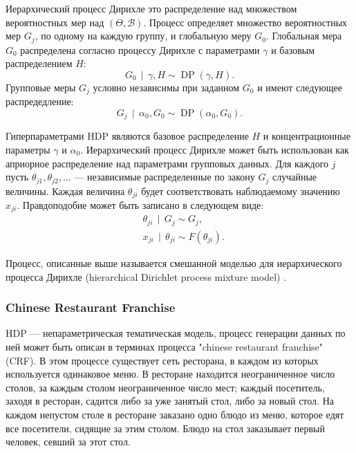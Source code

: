 \documentclass[14pt,a4paper,oneside]{extarticle}
\newcommand\todo[1]{\marginpar{\textcolor{red}{#1}}}
\DeclareMathOperator{\DP}{DP}
\DeclareMathOperator{\svert}{\,\vert\,}
\begin{document}
  Иерархический процесс Дирихле это распределение над множеством вероятностных мер над $(\Theta, \mathcal{B})$. Процесс определяет множество вероятностных мер $G_j$, по одному на каждую группу, и глобальную меру $G_0$. Глобальная мера $G_0$ распределена согласно процессу Дирихле с параметрами $\gamma$ и базовым распределением $H$:
  \begin{equation}
  G_0 \svert \gamma, H \sim \DP(\gamma, H).
  \end{equation}
  Групповые меры $G_j$ условно независимы при заданном $G_0$ и имеют следующее распредедление:
  \begin{equation}
  G_j \svert \alpha_0, G_0 \sim \DP(\alpha_0, G_0).
  \end{equation}
  
  Гиперпараметрами HDP являются базовое распределение $H$ и концентрационные параметры $\gamma$ и $\alpha_0$.
  Иерархический процесс Дирихле может быть использован как априорное распределение над параметрами групповых данных. Для каждого $j$ пусть $\theta_{j1}, \theta_{j2}, \ldots$ --- независимые распределенные по закону $G_j$ случайные величины. Каждая величина $\theta_{ji}$ будет соответствовать наблюдаемому значению $x_{ji}$. Правдоподобие может быть записано в следующем виде:
  \begin{equation}
  \begin{aligned}
  & \theta_{ji} \svert G_j \sim G_j, \\
  & x_{ji} \svert \theta_{ji} \sim F(\theta_{ji}).
  \end{aligned}
  \end{equation}
  
  Процесс, описанные выше называется смешанной моделью для иерархического процесса Дирихле (hierarchical Dirichlet process mixture model) \cite{hdp-1}.
  
  \subsubsection{Chinese Restaurant Franchise}

  
  HDP --- непараметрическая тематическая модель, процесс генерации данных по ней может быть описан в терминах процесса "chinese restaurant franchise" (CRF). В этом процессе существует сеть ресторана, в каждом из которых используется одинаковое меню. В ресторане находится неограниченное число столов, за каждым столом неограниченное число мест; каждый посетитель, заходя в ресторан, садится либо за уже занятый стол, либо за новый стол. На каждом непустом столе в ресторане заказано одно блюдо из меню, которое едят все посетители, сидящие за этим столом. Блюдо на стол заказывает первый человек, севший за этот стол.
  
\end{document}
